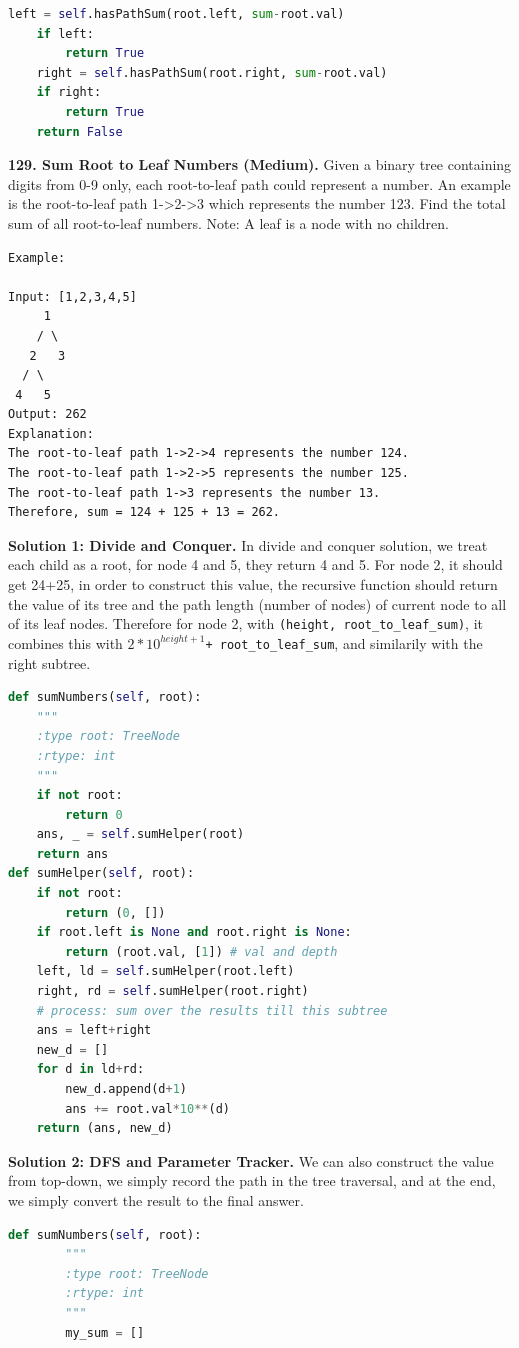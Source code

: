 \documentclass[../main.tex]{subfiles}
\begin{document}
\begin{examples}[resume]
\begin{lstlisting}[language=Python]
    left = self.hasPathSum(root.left, sum-root.val)
    if left:
        return True
    right = self.hasPathSum(root.right, sum-root.val)
    if right:
        return True
    return False
\end{lstlisting}
\item \textbf{129. Sum Root to Leaf Numbers (Medium).} Given a binary tree containing digits from 0-9 only, each root-to-leaf path could represent a number. An example is the root-to-leaf path 1->2->3 which represents the number 123. Find the total sum of all root-to-leaf numbers. Note: A leaf is a node with no children.
\begin{lstlisting}[numbers=none]
Example:

Input: [1,2,3,4,5]
     1
    / \
   2   3
  / \
 4   5
Output: 262
Explanation:
The root-to-leaf path 1->2->4 represents the number 124.
The root-to-leaf path 1->2->5 represents the number 125.
The root-to-leaf path 1->3 represents the number 13.
Therefore, sum = 124 + 125 + 13 = 262.
\end{lstlisting}
\textbf{Solution 1: Divide and Conquer.} In divide and conquer solution, we treat each child as a root, for node 4 and 5, they return 4 and 5. For node 2, it should get 24+25, in order to construct this value, the recursive function should return the value of its tree and the path length (number of nodes) of current node to all of its leaf nodes. Therefore for node 2, with \texttt{(height, root\_to\_leaf\_sum)}, it combines this with \texttt{$2*10^{height+1}$+ root\_to\_leaf\_sum}, and similarily with the right subtree. 
\begin{lstlisting}[language=Python]
def sumNumbers(self, root):
    """
    :type root: TreeNode
    :rtype: int
    """
    if not root:
        return 0
    ans, _ = self.sumHelper(root)
    return ans
def sumHelper(self, root):
    if not root:
        return (0, [])
    if root.left is None and root.right is None:
        return (root.val, [1]) # val and depth
    left, ld = self.sumHelper(root.left)
    right, rd = self.sumHelper(root.right)
    # process: sum over the results till this subtree
    ans = left+right
    new_d = []
    for d in ld+rd:
        new_d.append(d+1)
        ans += root.val*10**(d)
    return (ans, new_d)
\end{lstlisting}
\textbf{Solution 2: DFS and Parameter Tracker.} We can also construct the value from top-down, we simply record the path in the tree traversal, and at the end, we simply convert the result to the final answer. 
\begin{lstlisting}[language=Python]
 def sumNumbers(self, root):
        """
        :type root: TreeNode
        :rtype: int
        """
        my_sum = []
        

\end{lstlisting}
\end{examples}
\end{document}
